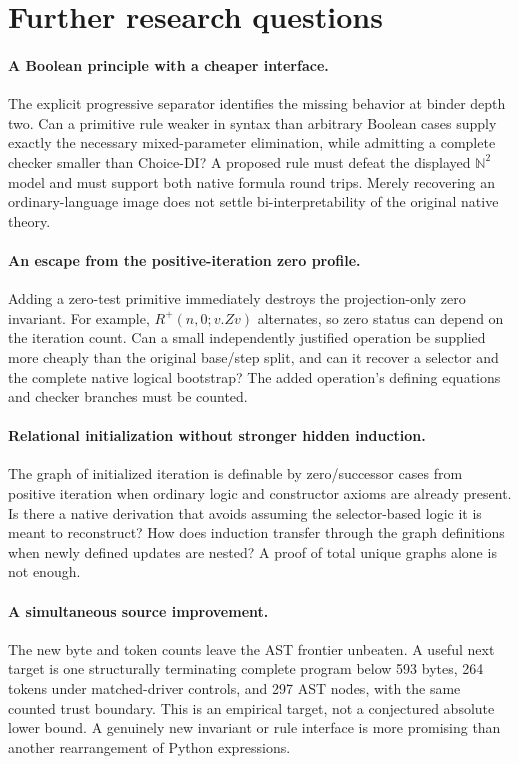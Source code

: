 \documentclass[11pt,letterpaper]{article}
\theoremstyle{definition}\newtheorem{definition}[theorem]{Definition}
\theoremstyle{remark}\newtheorem{remark}[theorem]{Remark}
\begin{document}
\section{Further research questions}

\paragraph{A Boolean principle with a cheaper interface.}
The explicit progressive separator identifies the missing behavior at
binder depth two. Can a primitive rule weaker in syntax than arbitrary
Boolean cases supply exactly the necessary mixed-parameter elimination,
while admitting a complete checker smaller than Choice-DI? A proposed
rule must defeat the displayed $\mathbb N^2$ model and must support both
native formula round trips. Merely recovering an ordinary-language image
does not settle bi-interpretability of the original native theory.

\paragraph{An escape from the positive-iteration zero profile.}
Adding a zero-test primitive immediately destroys the projection-only
zero invariant. For example, $R^+(n,0;v.Zv)$ alternates, so zero status
can depend on the iteration count. Can a small independently justified
operation be supplied more cheaply than the original base/step split,
and can it recover a selector and the complete native logical bootstrap?
The added operation's defining equations and checker branches must be
counted.

\paragraph{Relational initialization without stronger hidden induction.}
The graph of initialized iteration is definable by zero/successor cases
from positive iteration when ordinary logic and constructor axioms are
already present. Is there a native derivation that avoids assuming the
selector-based logic it is meant to reconstruct? How does induction
transfer through the graph definitions when newly defined updates are
nested? A proof of total unique graphs alone is not enough.

\paragraph{A simultaneous source improvement.}
The new byte and token counts leave the AST frontier unbeaten. A useful
next target is one structurally terminating complete program below
593 bytes, 264 tokens under matched-driver controls, and 297 AST nodes,
with the same counted trust boundary. This is an empirical target,
not a conjectured absolute lower bound. A genuinely new invariant or
rule interface is more promising than another rearrangement of Python
expressions.
\end{document}
